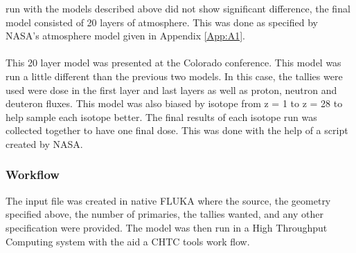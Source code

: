 run with the models described above did not show significant difference, the
final model consisted of 20 layers of atmosphere. This was done as specified by
NASA's atmosphere model given in Appendix \ref{App:A1}.
\\
\\
This 20 layer model was presented at the Colorado conference. This model was run
a little different than the previous two models. In this case, the tallies were
used were dose in the first layer and last layers as well as proton, neutron
and deuteron fluxes. This model was also biased by isotope from z = 1 to z = 28
to help sample each isotope better. The final results of each isotope run was
collected together to have one final dose. This was done with the help of a
script created by NASA.

\subsubsection{Workflow}
The input file was created in native FLUKA where the source, the geometry
specified above, the number of primaries, the tallies wanted, and any other
specification were provided. The model was then run in a High Throughput
Computing system with the aid a CHTC tools work flow.
